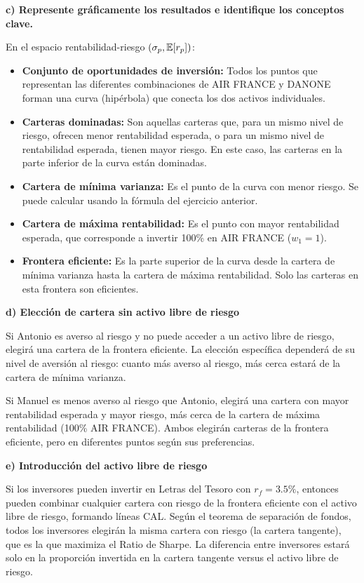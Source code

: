 \begin{ejemplo}
\textbf{c) Represente gráficamente los resultados e identifique los conceptos clave.}

En el espacio rentabilidad-riesgo $(\sigma_p, \mathbb{E}[r_p])$:

\begin{itemize}
\item \textbf{Conjunto de oportunidades de inversión:} Todos los puntos que representan las diferentes combinaciones de AIR FRANCE y DANONE forman una curva (hipérbola) que conecta los dos activos individuales.

\item \textbf{Carteras dominadas:} Son aquellas carteras que, para un mismo nivel de riesgo, ofrecen menor rentabilidad esperada, o para un mismo nivel de rentabilidad esperada, tienen mayor riesgo. En este caso, las carteras en la parte inferior de la curva están dominadas.

\item \textbf{Cartera de mínima varianza:} Es el punto de la curva con menor riesgo. Se puede calcular usando la fórmula del ejercicio anterior.

\item \textbf{Cartera de máxima rentabilidad:} Es el punto con mayor rentabilidad esperada, que corresponde a invertir 100\% en AIR FRANCE ($w_1 = 1$).

\item \textbf{Frontera eficiente:} Es la parte superior de la curva desde la cartera de mínima varianza hasta la cartera de máxima rentabilidad. Solo las carteras en esta frontera son eficientes.
\end{itemize}

\textbf{d) Elección de cartera sin activo libre de riesgo}

Si Antonio es averso al riesgo y no puede acceder a un activo libre de riesgo, elegirá una cartera de la frontera eficiente. La elección específica dependerá de su nivel de aversión al riesgo: cuanto más averso al riesgo, más cerca estará de la cartera de mínima varianza.

Si Manuel es menos averso al riesgo que Antonio, elegirá una cartera con mayor rentabilidad esperada y mayor riesgo, más cerca de la cartera de máxima rentabilidad (100\% AIR FRANCE). Ambos elegirán carteras de la frontera eficiente, pero en diferentes puntos según sus preferencias.

\textbf{e) Introducción del activo libre de riesgo}

Si los inversores pueden invertir en Letras del Tesoro con $r_f = 3.5\%$, entonces pueden combinar cualquier cartera con riesgo de la frontera eficiente con el activo libre de riesgo, formando líneas CAL. Según el teorema de separación de fondos, todos los inversores elegirán la misma cartera con riesgo (la cartera tangente), que es la que maximiza el Ratio de Sharpe. La diferencia entre inversores estará solo en la proporción invertida en la cartera tangente versus el activo libre de riesgo.


\end{ejemplo}
